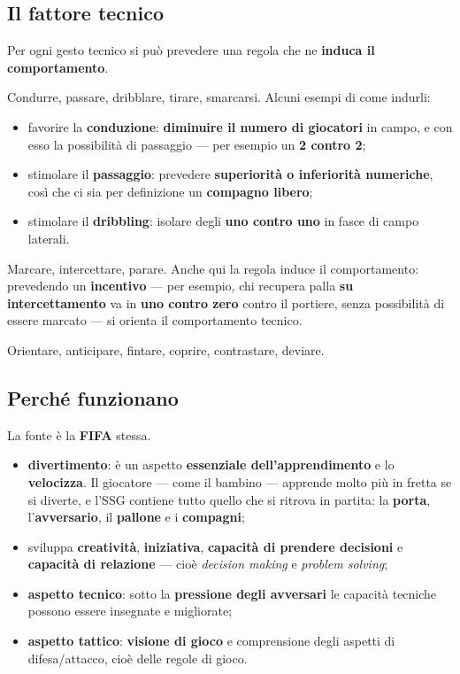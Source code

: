 \subsection{Il fattore tecnico}

Per ogni gesto tecnico si può prevedere una regola che ne \textbf{induca il comportamento}.

Condurre, passare, dribblare, tirare, smarcarsi. Alcuni esempi di come indurli:

\begin{itemize}
  \item favorire la \textbf{conduzione}: \textbf{diminuire il numero di giocatori} in campo, e con
    esso la possibilità di passaggio --- per esempio un \textbf{2 contro 2};
  \item stimolare il \textbf{passaggio}: prevedere \textbf{superiorità o inferiorità numeriche}, così
    che ci sia per definizione un \textbf{compagno libero};
  \item stimolare il \textbf{dribbling}: isolare degli \textbf{uno contro uno} in fasce di campo
    laterali.
\end{itemize}

Marcare, intercettare, parare. Anche qui la regola induce il comportamento: prevedendo un
\textbf{incentivo} --- per esempio, chi recupera palla \textbf{su intercettamento} va in
\textbf{uno contro zero} contro il portiere, senza possibilità di essere marcato --- si orienta il
comportamento tecnico.

Orientare, anticipare, fintare, coprire, contrastare, deviare.

\subsection{Perché funzionano}

La fonte è la \textbf{FIFA} stessa.

\begin{itemize}
  \item \textbf{divertimento}: è un aspetto \textbf{essenziale dell'apprendimento} e lo
    \textbf{velocizza}. Il giocatore --- come il bambino --- apprende molto più in fretta se si
    diverte, e l'SSG contiene tutto quello che si ritrova in partita: la \textbf{porta},
    l'\textbf{avversario}, il \textbf{pallone} e i \textbf{compagni};
  \item sviluppa \textbf{creatività}, \textbf{iniziativa}, \textbf{capacità di prendere decisioni} e
    \textbf{capacità di relazione} --- cioè \textit{decision making} e \textit{problem solving};
  \item \textbf{aspetto tecnico}: sotto la \textbf{pressione degli avversari} le capacità tecniche
    possono essere insegnate e migliorate;
  \item \textbf{aspetto tattico}: \textbf{visione di gioco} e comprensione degli aspetti di
    difesa/attacco, cioè delle regole di gioco.
\end{itemize}

